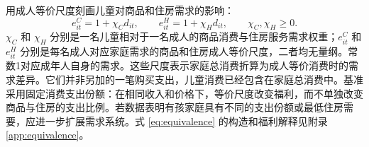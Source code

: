 \documentclass[UTF8,a4paper,zihao=-4,fontset=windows]{ctexart}
\numberwithin{equation}{section}
\begin{document}
用成人等价尺度刻画儿童对商品和住房需求的影响：
\begin{equation}
  e^C_{it}=1+\chi_Cd_{it},\qquad
  e^H_{it}=1+\chi_Hd_{it},\qquad \chi_C,\chi_H\geq0.
  \label{eq:equivalence}
\end{equation}
$\chi_C$ 和 $\chi_H$ 分别是一名儿童相对于一名成人的商品消费与住房服务需求权重；$e^C_{it}$ 和 $e^H_{it}$ 分别是每名成人对应家庭需求的商品和住房成人等价尺度，二者均无量纲。常数1对应成年人自身的需求。这些尺度表示家庭总消费折算为成人等价消费时的需求差异。它们并非另加的一笔购买支出，儿童消费已经包含在家庭总消费中。基准采用固定消费支出份额：在相同收入和价格下，等价尺度改变福利，而不单独改变商品与住房的支出比例。若数据表明有孩家庭具有不同的支出份额或最低住房需要，应进一步扩展需求系统。式 \eqref{eq:equivalence} 的构造和福利解释见附录\ref{app:equivalence}。
\end{document}
